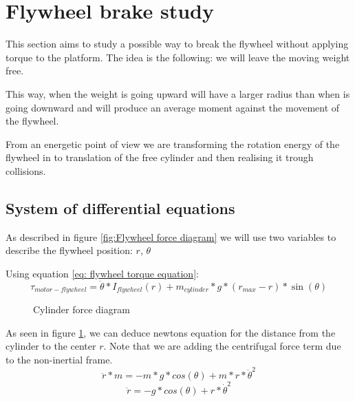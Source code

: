 \section{Flywheel brake study}

This section aims to study a possible way to break the flywheel without applying torque to the platform. The idea is the following: we will leave the moving weight free.

This way, when the weight is going upward will have a larger radius than when is going downward and will produce an average moment against the movement of the flywheel.

From an energetic point of view we are transforming the rotation energy of the flywheel in to translation of the free cylinder and then realising it trough collisions.
\subsection{System of differential equations}
As described in figure \ref{fig:Flywheel force diagram} we will use two variables to describe the flywheel position: $r$, $\theta$ 

Using equation \ref{eq: flywheel torque equation}:
\[\tau_{motor-flywheel} = \ddot{\theta}*I_{flywheel}(r) + m_{cylinder} * g * 
(r_{max} - r) * \sin({\theta})  \]
\begin{figure}[H]
	\centering
	\caption{Cylinder force diagram}
	\label{fig:Cylinder force diagram}
\end{figure}

As seen in figure \ref{fig:Cylinder force diagram}, we can deduce newtons equation for the distance from the cylinder to the center $r$. Note that we are adding the centrifugal force term due to the non-inertial frame.
\[\ddot{r} * m = -m * g * cos(\theta) + m * r * \dot{\theta}^2 \]
\[\ddot{r} = -g * cos(\theta) + r * \dot{\theta}^2 \]

